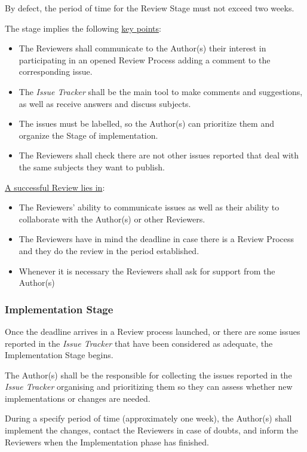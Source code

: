 \documentclass{template/openetcs_article}
\begin{document}
By defect, the period of time for the Review Stage must not exceed two weeks.

The stage implies the following \underline{key points}:

\begin{itemize}
\item The Reviewers shall communicate to the Author(s) their interest in participating in an opened Review Process adding a comment to the corresponding issue. 
\item The {\it Issue Tracker} shall be the main tool to make comments and suggestions, as well as receive answers and discuss subjects.
\item The issues must be labelled, so the Author(s) can prioritize them and organize the Stage of implementation.
\item The Reviewers shall check there are not other issues reported that deal with the same subjects they want to publish.
\end{itemize}

\underline{A successful Review lies in}:
\begin{itemize}
\item The Reviewers' ability to communicate issues as well as their ability to collaborate with the Author(s) or other Reviewers. 
\item The Reviewers have in mind the deadline in case there is a Review Process and they do the review in the period established.
\item Whenever it is necessary the Reviewers shall ask for support from the Author(s)
\end{itemize}

\subsubsection{Implementation Stage}

Once the deadline arrives in a Review process launched, or there are some issues reported in the {\it Issue Tracker} that have been considered as adequate, the Implementation Stage begins.

The Author(s) shall be the responsible for collecting the issues reported in the {\it Issue Tracker} organising and prioritizing them so they can assess whether new implementations or changes are needed.

During a specify period of time (approximately one week), the Author(s) shall implement the changes, contact the Reviewers in case of doubts, and inform the Reviewers when the Implementation phase has finished.
\end{document}
